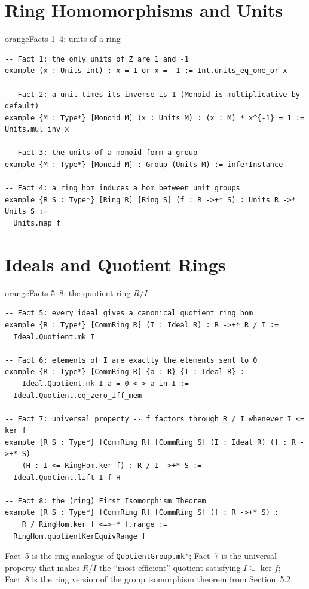 \documentclass[11pt]{article}
\begin{document}
\section{Ring Homomorphisms and Units}

\begin{defbox}{orange}{Facts 1--4: units of a ring}
\begin{lstlisting}
-- Fact 1: the only units of Z are 1 and -1
example (x : Units Int) : x = 1 or x = -1 := Int.units_eq_one_or x

-- Fact 2: a unit times its inverse is 1 (Monoid is multiplicative by default)
example {M : Type*} [Monoid M] (x : Units M) : (x : M) * x^{-1} = 1 := Units.mul_inv x

-- Fact 3: the units of a monoid form a group
example {M : Type*} [Monoid M] : Group (Units M) := inferInstance

-- Fact 4: a ring hom induces a hom between unit groups
example {R S : Type*} [Ring R] [Ring S] (f : R ->+* S) : Units R ->* Units S :=
  Units.map f
\end{lstlisting}
\end{defbox}

\section{Ideals and Quotient Rings}

\begin{defbox}{orange}{Facts 5--8: the quotient ring \texorpdfstring{$R/I$}{R/I}}
\begin{lstlisting}
-- Fact 5: every ideal gives a canonical quotient ring hom
example {R : Type*} [CommRing R] (I : Ideal R) : R ->+* R / I :=
  Ideal.Quotient.mk I

-- Fact 6: elements of I are exactly the elements sent to 0
example {R : Type*} [CommRing R] {a : R} {I : Ideal R} :
    Ideal.Quotient.mk I a = 0 <-> a in I :=
  Ideal.Quotient.eq_zero_iff_mem

-- Fact 7: universal property -- f factors through R / I whenever I <= ker f
example {R S : Type*} [CommRing R] [CommRing S] (I : Ideal R) (f : R ->+* S)
    (H : I <= RingHom.ker f) : R / I ->+* S :=
  Ideal.Quotient.lift I f H

-- Fact 8: the (ring) First Isomorphism Theorem
example {R S : Type*} [CommRing R] [CommRing S] (f : R ->+* S) :
    R / RingHom.ker f <=>+* f.range :=
  RingHom.quotientKerEquivRange f
\end{lstlisting}
Fact~5 is the ring analogue of \verb|QuotientGroup.mk'|; Fact~7 is the universal property that makes $R/I$ the ``most efficient'' quotient satisfying $I\subseteq\ker f$; Fact~8 is the ring version of the group isomorphism theorem from Section~5.2.
\end{defbox}
\end{document}
